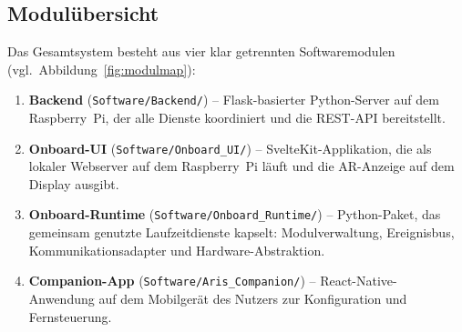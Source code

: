 \subsection{Modulübersicht}
\label{subsec:moduluebersicht}

Das Gesamtsystem besteht aus vier klar getrennten Softwaremodulen
(vgl.\ Abbildung~\ref{fig:modulmap}):

\begin{enumerate}
  \item \textbf{Backend} (\texttt{Software/Backend/}) -- Flask-basierter
    Python-Server auf dem Raspberry~Pi, der alle Dienste koordiniert und die
    REST-API bereitstellt.
  \item \textbf{Onboard-UI} (\texttt{Software/Onboard\_UI/}) -- SvelteKit-Applikation,
    die als lokaler Webserver auf dem Raspberry~Pi läuft und die AR-Anzeige
    auf dem Display ausgibt.
  \item \textbf{Onboard-Runtime} (\texttt{Software/Onboard\_Runtime/}) -- Python-Paket,
    das gemeinsam genutzte Laufzeitdienste kapselt: Modulverwaltung, Ereignisbus,
    Kommunikationsadapter und Hardware-Abstraktion.
  \item \textbf{Companion-App} (\texttt{Software/Aris\_Companion/}) -- React-Native-
    Anwendung auf dem Mobilgerät des Nutzers zur Konfiguration und Fernsteuerung.
\end{enumerate}

